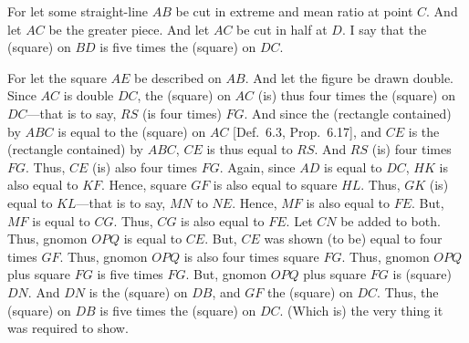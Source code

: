 \begin{Parallel}{}{}
{\epsfysize=2.5in
\centerline{}

For let some straight-line $AB$ be cut in extreme and mean ratio
at point $C$. And let $AC$ be the greater piece. And let $AC$ be
cut in half at $D$. I say that the (square) on $BD$ is five times the
(square) on $DC$. 

For let the square $AE$ be described on $AB$. And let the
figure be drawn double. Since $AC$ is double $DC$, the
(square) on $AC$ (is) thus four times the (square) on $DC$---that
is to say, $RS$ (is four times) $FG$. And since the (rectangle contained)
by $ABC$ is equal to the (square) on $AC$ [Def.~6.3, Prop.~6.17],
and $CE$ is the (rectangle contained) by $ABC$,  $CE$ is thus equal
to $RS$. And $RS$ (is) four times $FG$. Thus, $CE$ (is) also four times
$FG$. Again, since $AD$ is equal to $DC$, $HK$ is also equal to
$KF$. Hence, square $GF$ is also equal to square $HL$. Thus,
$GK$ (is) equal to $KL$---that is to say, $MN$ to $NE$. 
Hence, $MF$ is also equal to $FE$. But, $MF$ is equal to $CG$.
Thus, $CG$ is also equal to $FE$. Let $CN$ be added to both.
Thus, gnomon $OPQ$ is equal to $CE$. But, $CE$ was shown (to be)
equal to four times $GF$. Thus, gnomon $OPQ$  is also four times
square $FG$. Thus, gnomon $OPQ$ plus square $FG$ is five times
$FG$. But, gnomon $OPQ$ plus square $FG$ is (square) $DN$. 
And  $DN$ is the (square) on $DB$, and $GF$ the (square)
on $DC$. Thus, the (square) on $DB$ is five times the (square)
on $DC$. (Which is) the very thing it was required to show.}
\end{Parallel}

